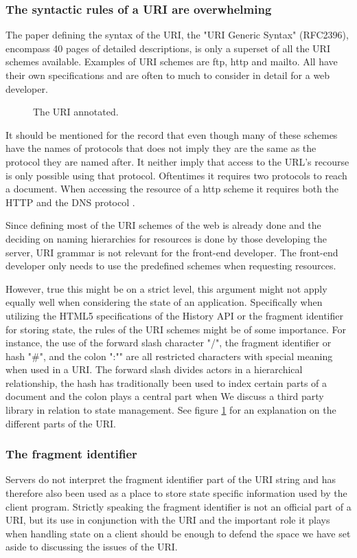 \documentclass[english]{ifimaster}
\begin{document}
\subsubsection{The syntactic rules of a URI are overwhelming}
The paper defining the syntax of the URI, the "URI Generic Syntax" (RFC2396), encompass 40 pages of detailed descriptions, is only a superset of all the URI schemes available. Examples of URI schemes are ftp, http and mailto. All have their own specifications and are often to much to consider in detail for a web developer. 
\begin{figure}
\centering

\caption{The URI annotated.} \label{fig:uri}

\end{figure}
It should be mentioned for the record that even though many of these schemes have the names of protocols that does not imply they are the same as the protocol they are named after. It neither imply that access to the URL's recourse is only possible using that protocol. Oftentimes it requires two protocols to reach a document. When accessing the resource of a http scheme it requires both the HTTP and the DNS protocol \parencite{rfc_URI}.

Since defining most of the URI schemes of the web is already done and the deciding on naming hierarchies for resources is done by those developing the server, URI grammar is not relevant for the front-end developer. The front-end developer only needs to use the predefined schemes when requesting resources. 

However, true this might be on a strict level, this argument might not apply equally well when considering the state of an application. Specifically when utilizing the HTML5 specifications of the History API or the fragment identifier for storing state, the rules of the URI schemes might be of some importance. For instance, the use of the forward slash character "/", the fragment identifier or hash "\#", and the colon ":"" are all restricted characters with special meaning when used in a URI. The forward slash divides actors in a hierarchical relationship, the hash has traditionally been used to index certain parts of a document and the colon plays a central part when We discuss a third party library in relation to state management. See figure \ref{fig:uri} for an explanation on the different parts of the URI.

\subsubsection{The fragment identifier}
Servers do not interpret the fragment identifier part of the URI string and has therefore also been used as a place to store state specific information used by the client program. Strictly speaking the fragment identifier is not an official part of a URI, but its use in conjunction with the URI and the important role it plays when handling state on a client should be enough to defend the space we have set aside to discussing the issues of the URI.
\end{document}
